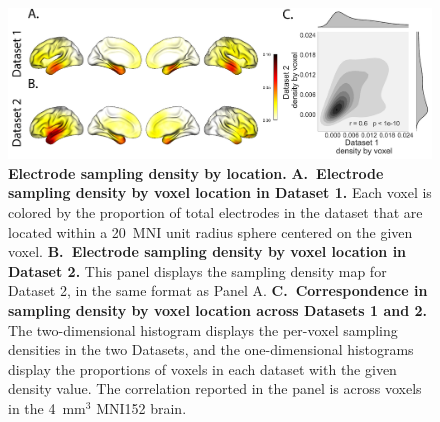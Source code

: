 \documentclass[11pt]{article}
\begin{document}
\begin{figure}
  \centering \includegraphics[width=\textwidth]{figs/density}
  \caption{\textbf{Electrode sampling density by location.} \textbf{A.~Electrode
  sampling density by voxel location in Dataset 1.} Each voxel is colored by the
  proportion of total electrodes in the dataset that are located within a 20~MNI
  unit radius sphere centered on the given voxel.  \textbf{B.~Electrode sampling
  density by voxel location in Dataset 2.}  This panel displays the sampling
  density map for Dataset 2, in the same format as Panel A.
  \textbf{C.~Correspondence in sampling density by voxel location across
  Datasets 1 and 2.}  The two-dimensional histogram displays the per-voxel
  sampling densities in the two Datasets, and the one-dimensional histograms
  display the proportions of voxels in each dataset with the given density
  value.  The correlation reported in the panel is across voxels in the 4~mm$^3$
  MNI152 brain.} \label{fig:density}
\end{figure}
\end{document}
